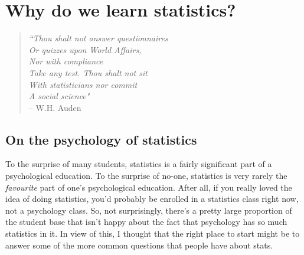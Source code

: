 
\chapter{Why do we learn statistics?~\label{ch:whystats}}

\begin{quote}{\it
``Thou shalt not answer questionnaires \\
Or quizzes upon World Affairs, \\
\hspace*{.5cm}    Nor with compliance \\
Take any test. Thou shalt not sit  \\
With statisticians nor commit \\
\hspace*{.5cm}    A social science" }\vspace*{6pt} \\ 
\hspace*{2cm} -- W.H. Auden
\end{quote}
\vspace*{12pt}

\section{On the psychology of statistics~\label{sec:whywhywhy}}

To the surprise of many students, statistics is a fairly significant part of a psychological education. To the surprise of no-one, statistics is very rarely the {\it favourite} part of one's psychological education. After all, if you really loved the idea of doing statistics, you'd probably be enrolled in a statistics class right now, not a psychology class. So, not surprisingly, there's a pretty large proportion of the student base that isn't happy about the fact that psychology has so much statistics in it. In view of this, I thought that the right place to start might be to answer some of the more common questions that people have about stats. 

